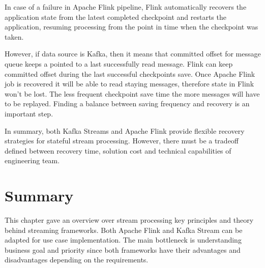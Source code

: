 \begin{description}
    In case of a failure in Apache Flink pipeline, Flink automatically recovers the application
    state from the latest completed checkpoint and restarts the application,
    resuming processing from the point in time when the checkpoint was taken.

    However, if data source is Kafka, then it means that committed offset for message queue
    keeps a pointed to a last successfully read message.
    Flink can keep committed offset during the last successful checkpoints save.
    Once Apache Flink job is recovered it will be able to read staying messages,
    therefore state in Flink won't be lost.
    The less frequent checkpoint save time the more messages will have to be replayed.
    Finding a balance between saving frequency and recovery is an important step.

\end{description}

In summary, both Kafka Streams and Apache Flink provide flexible recovery strategies
for stateful stream processing.
However, there must be a tradeoff defined between recovery time, solution cost and
technical capabilities of engineering team.


\section{Summary}\label{sec:summary}
This chapter gave an overview over stream processing key principles and theory behind
streaming frameworks.
Both Apache Flink and Kafka Stream can be adapted for use case implementation.
The main bottleneck is understanding business goal and priority since both
frameworks have their advantages and disadvantages depending on the requirements.
